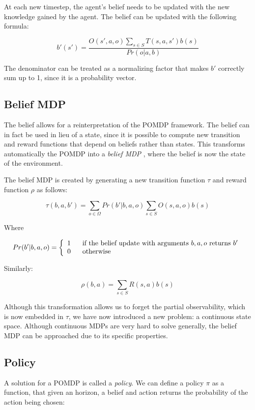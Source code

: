 At each new timestep, the agent's belief needs to be updated with the new knowledge gained by the
agent. The belief can be updated with the following formula:

\[ b'(s') = \frac{O(s', a, o)\sum_{s\in S}T(s,a,s')b(s)}{Pr(o|a,b)} \]

The denominator can be treated as a normalizing factor that makes $b'$ correctly sum up to 1, since
it is a probability vector.

\subsection{Belief MDP}

The belief allows for a reinterpretation of the POMDP framework. The belief can in fact be used in
lieu of a state, since it is possible to compute new transition and reward functions that depend on
beliefs rather than states. This transforms automatically the POMDP into a \textit{belief MDP}
\cite{cit:pomdp}, where the belief is now the state of the environment.

The belief MDP is created by generating a new transition function $\tau$ and reward function $\rho$
as follows:

\[ \tau(b,a,b') = \sum_{o\in \Omega} Pr(b' | b, a, o) \sum_{s\in S} O(s,a,o) b(s) \]

Where

\[Pr(b' | b, a, o) = \left\{
  \begin{array}{lr}
    1 \hspace{.6cm}\text{if the belief update with arguments $b,a,o$ returns $b'$}\\
    0 \hspace{.6cm}\text{otherwise}
  \end{array}
\right.
\]

Similarly:

\[ \rho(b,a) = \sum_{s\in S} R(s,a) b(s) \]

Although this transformation allows us to forget the partial observability, which is now embedded in
$\tau$, we have now introduced a new problem: a continuous state space. Although continuous MDPs are
very hard to solve generally, the belief MDP can be approached due to its specific properties.

\subsection{Policy}

A solution for a POMDP is called a \textit{policy}. We can define a policy $\pi$ as a function, that
given an horizon, a belief and action returns the probability of the action being chosen:

